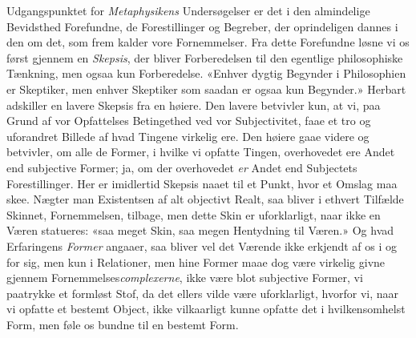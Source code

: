\documentclass[12pt,a4paper]{book}
\begin{document}
Udgangspunktet for \emph{Metaphysikens} Undersøgelser er
det i den almindelige Bevidsthed Forefundne, de Forestillinger
og Begreber, der oprindeligen dannes i den om det, som frem\-%
kalder vore Fornemmelser. Fra dette Forefundne løsne vi os
først gjennem en \emph{Skepsis}, der bliver Forberedelsen til den
egentlige philosophiske Tænkning, men ogsaa kun Forberedelse.
«Enhver dygtig Begynder i Philosophien er Skeptiker, men
enhver Skeptiker som saadan er ogsaa kun Begynder.» Herbart
adskiller en lavere Skepsis fra en høiere. Den lavere betvivler
kun, at vi, paa Grund af vor Opfattelses Betingethed ved
vor Subjectivitet, faae et tro og uforandret Billede af hvad
Tingene virkelig ere. Den høiere gaae videre og betvivler,
om alle de Former, i hvilke vi opfatte Tingen, overhovedet ere
Andet end subjective Former; ja, om der overhovedet \emph{er}
Andet end Subjectets Forestillinger. Her er imidlertid Skepsis
naaet til et Punkt, hvor et Omslag maa skee. Nægter man
Existentsen af alt objectivt Realt, saa bliver i ethvert Tilfælde
Skinnet, Fornemmelsen, tilbage, men dette Skin er uforklarligt,
naar ikke en Væren statueres: «saa meget Skin, saa megen
Hentydning til Væren.» Og hvad Erfaringens \emph{Former} angaaer,
saa bliver vel det Værende ikke erkjendt af os i og for sig,
men kun i Relationer, men hine Former maae dog være virkelig
givne gjennem Fornemmelses\emph{complexerne}, ikke være blot
subjective Former, vi paatrykke et formløst Stof, da det ellers
vilde være uforklarligt, hvorfor vi, naar vi opfatte et bestemt
Object, ikke vilkaarligt kunne opfatte det i hvilkensomhelst
Form, men føle os bundne til en bestemt Form.
\end{document}
